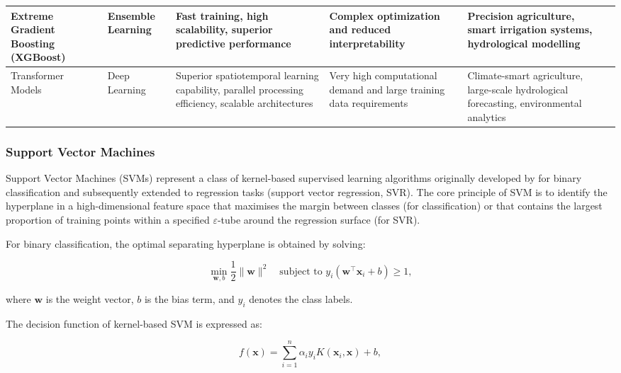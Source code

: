 \documentclass[land,article,submit,pdftex,moreauthors]{Definitions/mdpi}
\numberwithin{equation}{section}
\begin{document}
\begin{longtable}{p{1.4cm} p{1.3cm} p{2.6cm} p{2.6cm} p{2.6cm} p{2.3cm}}
Extreme Gradient Boosting (XGBoost) &
Ensemble Learning &
Fast training, high scalability, superior predictive performance &
Complex optimization and reduced interpretability &
Precision agriculture, smart irrigation systems, hydrological modelling &
\citep{Chen2016, rs17132129, Ghiat, Benassi} \\ \hline

Transformer Models &
Deep Learning &
Superior spatiotemporal learning capability, parallel processing efficiency, scalable architectures &
Very high computational demand and large training data requirements &
Climate-smart agriculture, large-scale hydrological forecasting, environmental analytics &
\citep{Devlin2018, Wu2021_Trans, Nguyen} \\

\end{longtable}
\normalsize

\subsubsection{Support Vector Machines}

Support Vector Machines (SVMs) represent a class of kernel-based supervised learning algorithms originally developed by \citet{cortes1995support} for binary classification and subsequently extended to regression tasks (support vector regression, SVR). The core principle of SVM is to identify the hyperplane in a high-dimensional feature space that maximises the margin between classes (for classification) or that contains the largest proportion of training points within a specified $\varepsilon$-tube around the regression surface (for SVR).

For binary classification, the optimal separating hyperplane is obtained by solving:

\begin{equation}
\min_{\mathbf{w},b} \frac{1}{2}\|\mathbf{w}\|^2
\quad
\text{subject to }
y_i(\mathbf{w}^\top \mathbf{x}_i+b)\geq 1,
\end{equation}

where $\mathbf{w}$ is the weight vector, $b$ is the bias term, and $y_i$ denotes the class labels.

The decision function of kernel-based SVM is expressed as:

\begin{equation}
f(\mathbf{x})=\sum_{i=1}^{n}\alpha_i y_i K(\mathbf{x}_i,\mathbf{x})+b,
\end{equation}
\end{document}

